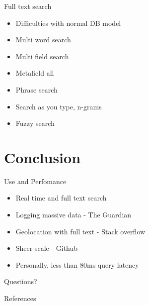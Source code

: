 \documentclass[10pt]{beamer}
\begin{document}
\begin{frame}{Full text search}
	\begin{itemize}
		\item Difficulties with normal DB model
		\item Multi word search
		\item Multi field search
		\item Metafield all
		\item Phrase search
		\item Search as you type, n-grams
		\item Fuzzy search
	\end{itemize}
\end{frame}


\section{Conclusion}
\begin{frame}{Use and Perfomance}
	\begin{itemize}
		\item Real time and full text search
		\item Logging massive data - The Guardian
		\item Geolocation with full text - Stack overflow
		\item Sheer scale - Github
		\item Personally, less than 80ms query latency
	\end{itemize}
\end{frame}

\begin{frame}[standout]
  Questions?
\end{frame}

\begin{frame}[allowframebreaks]{References}

  
  

\end{frame}
\end{document}
